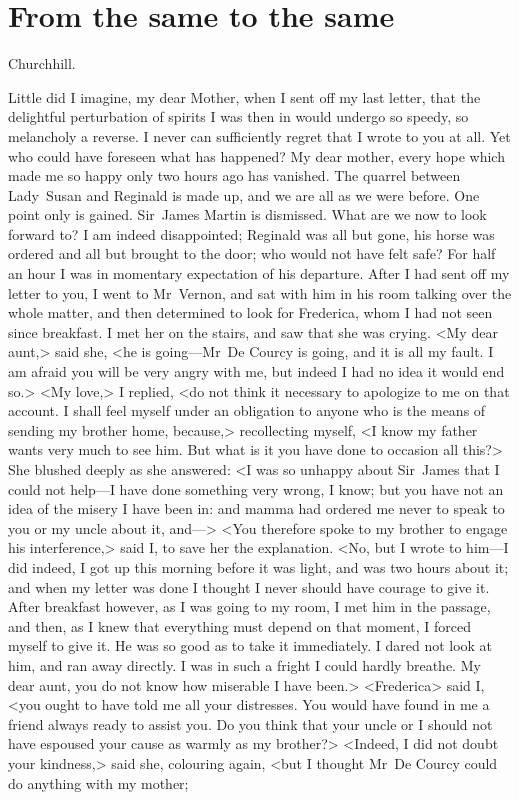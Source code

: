 \chapter{From the same to the same}
  
  	\begin{a4}
	\vspace{5em}
	\end{a4}
	
  \begin{mail}{Churchhill.}{}

Little did I imagine, my dear Mother, when I sent off my last letter, that the delightful perturbation of spirits I was then in would undergo so speedy, so melancholy a reverse. I never can sufficiently regret that I wrote to you at all. Yet who could have foreseen what has happened? My dear mother, every hope which made me so happy only two hours ago has vanished. The quarrel between Lady~Susan and Reginald is made up, and we are all as we were before. One point only is gained. Sir~James Martin is dismissed. What are we now to look forward to? I am indeed disappointed; Reginald was all but gone, his horse was ordered and all but brought to the door; who would not have felt safe? For half an hour I was in momentary expectation of his departure. After I had sent off my letter to you, I went to Mr~Vernon, and sat with him in his room talking over the whole matter, and then determined to look for Frederica, whom I had not seen since breakfast. I met her on the stairs, and saw that she was crying. <My dear aunt,> said she, <he is going—Mr~De Courcy is going, and it is all my fault. I am afraid you will be very angry with me, but indeed I had no idea it would end so.> <My love,> I replied, <do not think it necessary to apologize to me on that account. I shall feel myself under an obligation to anyone who is the means of sending my brother home, because,> recollecting myself, <I know my father wants very much to see him. But what is it you have done to occasion all this?> She blushed deeply as she answered: <I was so unhappy about Sir~James that I could not help—I have done something very wrong, I know; but you have not an idea of the misery I have been in: and mamma had ordered me never to speak to you or my uncle about it, and—> <You therefore spoke to my brother to engage his interference,> said I, to save her the explanation. <No, but I wrote to him—I did indeed, I got up this morning before it was light, and was two hours about it; and when my letter was done I thought I never should have courage to give it. After breakfast however, as I was going to my room, I met him in the passage, and then, as I knew that everything must depend on that moment, I forced myself to give it. He was so good as to take it immediately. I dared not look at him, and ran away directly. I was in such a fright I could hardly breathe. My dear aunt, you do not know how miserable I have been.> <Frederica> said I, <you ought to have told me all your distresses. You would have found in me a friend always ready to assist you. Do you think that your uncle or I should not have espoused your cause as warmly as my brother?> <Indeed, I did not doubt your kindness,> said she, colouring again, <but I thought Mr~De Courcy could do anything with my mother; 
\end{mail}

